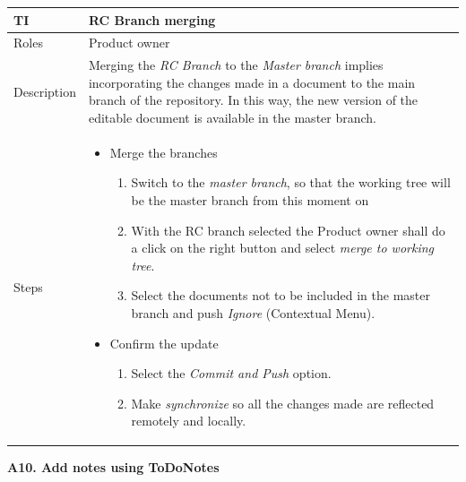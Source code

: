 \documentclass{template/openetcs_article}
\begin{document}
\begin{flushleft}
\tablefirsthead{}
\tablehead{}
\tabletail{}
\tablelasttail{}
\begin{supertabular}{|m{2cm}|m{13cm}|}
\hline
{}
TI & 
RC Branch merging
\\\hline
Roles &
Product owner
\\\hline
Description &
Merging the {\it RC Branch} to the {\it Master branch} implies incorporating the changes made in a document to the main branch of the repository. In this way, the new version of the editable document is available in the master branch.
\\\hline
Steps &
\begin{itemize}
\item Merge the branches 
\begin{enumerate}
\item Switch to the {\it master branch}, so that the working tree will be the master branch from this moment on
\item With the RC branch selected the Product owner shall do a click on the right button and select {\it merge to working tree}.
\item Select the documents not to be included in the master branch and push {\it Ignore} (Contextual Menu).
\end{enumerate}
\item Confirm the update
\begin{enumerate}
\item Select the {\it Commit and Push} option.
\item Make {\it synchronize} so all the changes made are reflected remotely and locally.
\end{enumerate}
\end{itemize}
\\\hline
\end{supertabular}
\end{flushleft}


\textbf{A10. Add notes using ToDoNotes}
\end{document}
